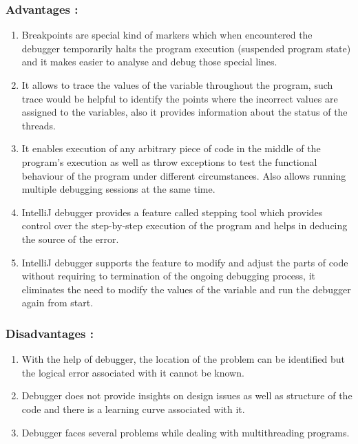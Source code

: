 \documentclass[12pt, a4paper]{article}
\begin{document}
\subsubsection{Advantages : }
\begin{enumerate}
    \item Breakpoints are special kind of markers which when encountered the debugger temporarily halts the program execution (suspended program state) and it makes easier to analyse and debug those special lines.
    \item It allows to trace the values of the variable throughout the program, such trace would be helpful to identify the points where the incorrect values are assigned to the variables, also it provides information about the status of the threads.
    \item It enables execution of any arbitrary piece of code in the middle of the program's execution as well as throw exceptions to test the functional behaviour of the program under different circumstances. Also allows running multiple debugging sessions at the same time.
    \item IntelliJ debugger provides a feature called stepping tool which provides control over the step-by-step execution of the program and helps in deducing the source of the error.
    \item IntelliJ debugger supports the feature to modify and adjust the parts of code without requiring to termination of the ongoing debugging process, it eliminates the need to modify the values of the variable and run the debugger again from start.
\end{enumerate}

\subsubsection{Disadvantages : }
\begin{enumerate}
    \item With the help of debugger, the location of the problem can be identified but the logical error associated with it cannot be known.
    \item Debugger does not provide insights on design issues as well as structure of the code and there is a learning curve associated with it.
    \item Debugger faces several problems while dealing with multithreading programs. 
\end{enumerate}

\newpage
\end{document}
